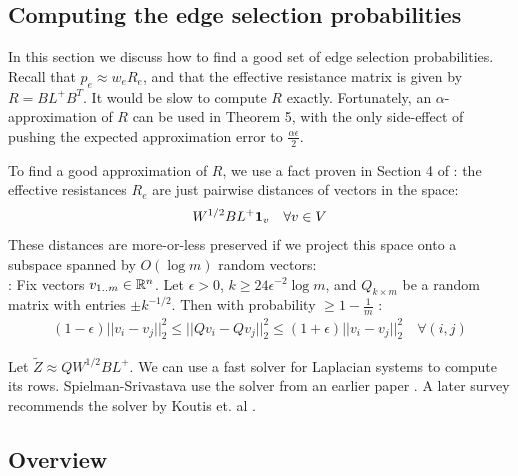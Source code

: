 \documentclass{article}
\begin{document}
\subsection{Computing the edge selection probabilities}

In this section we discuss how to find a good set of edge selection
probabilities. Recall that $p_e \approx w_eR_e$, and that the effective
resistance matrix is given by $R = BL^+B^T$. It would be slow to compute $R$
exactly.  Fortunately, an $\alpha$-approximation of $R$ can be used in
Theorem 5, with the only side-effect of pushing the expected approximation
error to $\frac{\alpha\epsilon}{2}$.

To find a good approximation of $R$, we use a fact proven in Section 4 of
\cite{SpielmanSrivastava}: the effective resistances $R_e$ are just pairwise
distances of vectors in the space:
\begin{align*}
    W^{1/2}BL^+\mathbf{1}_v \quad \forall{v \in V}
\end{align*}
These distances are more-or-less preserved if we project this space onto a
subspace spanned by $O(\log m)$ random vectors: \\

\noindent
{}: Fix vectors $v_{1..m} \in
\mathbb{R}^n$. Let $\epsilon > 0$, $k \geq 24\epsilon^{-2}\log m$, and $Q_{k \times
m}$ be a random matrix with entries $\pm k^{-1/2}$. Then with probability
$\geq 1 - \frac{1}{m}$ \cite{SpielmanSrivastava} \cite{Achlioptas}:
\begin{align*}
    (1-\epsilon)||v_i-v_j||^2_2 \leq ||Qv_i-Qv_j||^2_2 \leq
    (1+\epsilon)||v_i-v_j||^2_2 \quad \forall{(i,j)}
\end{align*}

Let $\tilde{Z} \approx QW^{1/2}BL^+$. We can use a fast solver for Laplacian
systems to compute its rows. Spielman-Srivastava use the solver from an
earlier paper \cite{SpielmanTeng}. A later survey recommends the solver by
Koutis et. al \cite{TheSurvey} \cite{FastLaplacianSolver}.

\subsection{Overview}
\end{document}
